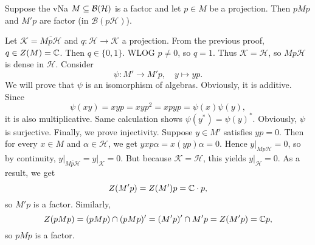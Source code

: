 \begin{corollary}
  Suppose the vNa $M \subseteq \operatorname{\mathcal{B} (\mathcal{H})}$ is a factor and let $p \in M$
  be a projection. Then $pMp$ and $M' p$ are factor (in $\mathcal{B}(p \mathcal{H})$).
\end{corollary}

\begin{myproof}
  Let $\mathcal{K} = \overline{Mp \mathcal{H}}$ and $q: \mathcal{H} \to \mathcal{K}$ a projection.
  From the previous proof, $q \in Z(M) = \mathbb {C}$. Then $q \in \{0, 1\}$. WLOG $p \neq 0$, so $q = 1$.
  Thus $\mathcal{K} = \mathcal{H}$, so $Mp\mathcal{H}$ is dense in $\mathcal{H}$.
  Consider $$\psi: M' \to M' p,\quad y \mapsto yp.$$
  We will prove that $\psi$ is an isomorphism of algebras. Obviously, it is additive.
  Since 
  $$\psi(xy) = xyp = xyp^2 = xpyp = \psi(x)\psi(y),$$
  it is also multiplicative. Same calculation shows $\psi(y^*) = \psi(y)^*$.
  Obviously, $\psi$ is surjective. Finally, we prove injectivity. Suppose $y \in M'$ satisfies $yp = 0$.
  Then for every $x \in M$ and $\alpha \in \mathcal{H}$, we get $yxp\alpha = x(yp)\alpha = 0.$
  Hence $y\big|_{Mp\mathcal{H}} = 0$, so by continuity, $y\big|_{\overline{Mp\mathcal{H}}} = y\big|_{\mathcal{K}} = 0$.
  But because $\mathcal{K} = \mathcal{H}$, this yields $y\big|_{\mathcal{H}} = 0$.
  As a result, we get 
  $$Z(M' p) = Z(M') p = \mathbb {C} \cdot p,$$ so $M' p$ is a factor.
  Similarly,
  $$Z(pMp) = (pMp) \cap (pMp)' = (M'p)' \cap M'p = Z(M'p) = \mathbb {C} p,$$
  so $pMp$ is a factor. 
\end{myproof}